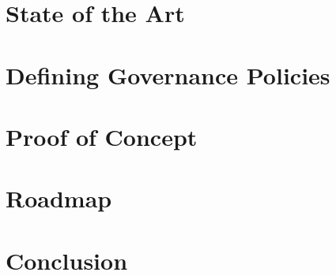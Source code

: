 \documentclass[10pt,conference]{IEEEtran}
\begin{document}
% 

\section{State of the Art}
\label{sec:motivation}


\section{Defining Governance Policies}
\label{sec:dsl}



\section{Proof of Concept}
\label{sec:proof-of-concept}


% 

% 

% 

\section{Roadmap}
\label{sec:discussion}


\section{Conclusion}
\label{sec:conclusion}





\end{document}
